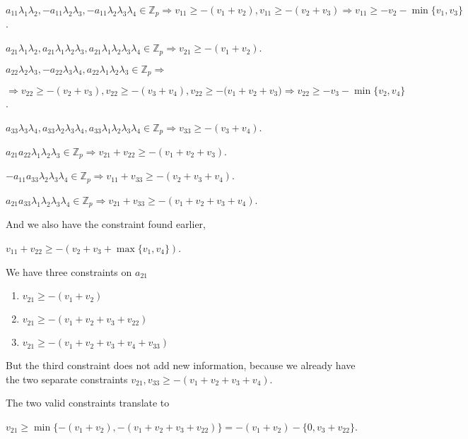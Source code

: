 \documentclass{article}
\begin{document}
$a_{11}\lambda_{1}\lambda_{2},-a_{11}\lambda_{2}\lambda_{3},-a_{11}\lambda_{2}\lambda_{3}\lambda_{4}\in\mathbb{Z}_{p}\Rightarrow{v_{11}\geq{-(v_{1}+v_{2})},v_{11}\geq{-(v_{2}+v_{3})}}\Rightarrow{v_{11}\geq{-v_{2}-\min\{v_{1},v_{3}\}}}$. 

$a_{21}\lambda_{1}\lambda_{2},a_{21}\lambda_{1}\lambda_{2}\lambda_{3},a_{21}\lambda_{1}\lambda_{2}\lambda_{3}\lambda_{4}\in\mathbb{Z}_{p}\Rightarrow{v_{21}\geq{-(v_{1}+v_{2})}}$.

$a_{22}\lambda_{2}\lambda_{3},-a_{22}\lambda_{3}\lambda_{4},a_{22}\lambda_{1}\lambda_{2}\lambda_{3}\in\mathbb{Z}_{p}\Rightarrow$

$\Rightarrow{v_{22}\geq{-(v_{2}+v_{3})},v_{22}\geq{-(v_{3}+v_{4})},v_{22}\geq{-(v_{1}+v_{2}+v_{3}}})\Rightarrow{v_{22}\geq{-v_{3}-\min\{v_{2},v_{4}\}}}$.

$a_{33}\lambda_{3}\lambda_{4},a_{33}\lambda_{2}\lambda_{3}\lambda_{4},a_{33}\lambda_{1}\lambda_{2}\lambda_{3}\lambda_{4}\in\mathbb{Z}_{p}\Rightarrow{v_{33}\geq{-(v_{3}+v_{4})}}$.

$a_{21}a_{22}\lambda_{1}\lambda_{2}\lambda_{3}\in\mathbb{Z}_{p}\Rightarrow{v_{21}+v_{22}\geq{-(v_{1}+v_{2}+v_{3})}}$.

$-a_{11}a_{33}\lambda_{2}\lambda_{3}\lambda_{4}\in\mathbb{Z}_{p}\Rightarrow{v_{11}+v_{33}\geq{-(v_{2}+v_{3}+v_{4})}}$.

$a_{21}a_{33}\lambda_{1}\lambda_{2}\lambda_{3}\lambda_{4}\in\mathbb{Z}_{p}\Rightarrow{v_{21}+v_{33}\geq{-(v_{1}+v_{2}+v_{3}+v_{4})}}$.

And we also have the constraint found earlier, 

$v_{11}+v_{22}\geq{-(v_{2}+v_{3}+\max\{v_{1},v_{4}\})}$.

We have three constraints on $a_{21}$
\begin{enumerate}
    \item $v_{21}\geq{-(v_{1}+v_{2})}$
    \item $v_{21}\geq{-(v_{1}+v_{2}+v_{3}+v_{22})}$
    \item $v_{21}\geq{-(v_{1}+v_{2}+v_{3}+v_{4}+v_{33})}$
\end{enumerate}
But the third constraint does not add new information, because we already have the two separate constraints $v_{21},v_{33}\geq{-(v_{1}+v_{2}+v_{3}+v_{4})}$.

The two valid constraints translate to 

$v_{21}\geq{\min\{-(v_{1}+v_{2}),-(v_{1}+v_{2}+v_{3}+v_{22})\}=-(v_{1}+v_{2})-\{0,v_{3}+v_{22}\}}$.
\end{document}
